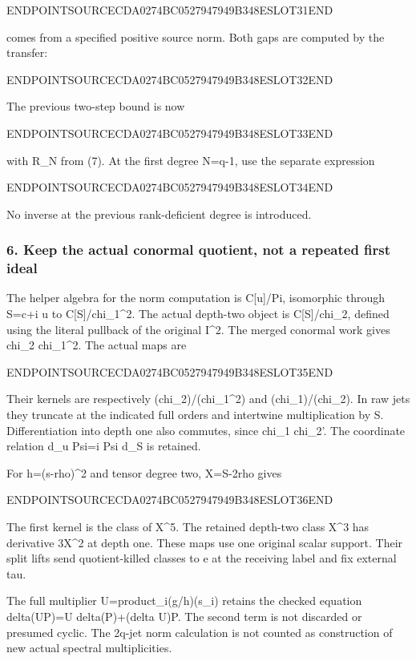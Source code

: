 ENDPOINTSOURCECDA0274BC0527947949B348ESLOT31END

comes from a specified positive source norm. Both gaps are computed by the transfer:

ENDPOINTSOURCECDA0274BC0527947949B348ESLOT32END

The previous two-step bound is now

ENDPOINTSOURCECDA0274BC0527947949B348ESLOT33END

with R\_N from (7). At the first degree N=q-1, use the separate expression

ENDPOINTSOURCECDA0274BC0527947949B348ESLOT34END

No inverse at the previous rank-deficient degree is introduced.

\subsubsection{6. Keep the actual conormal quotient, not a repeated first ideal}\label{endpoint-pr24_original--keep-the-actual-conormal-quotient-not-a-repeated-first-ideal}

The helper algebra for the norm computation is C{[}u{]}/Pi, isomorphic through S=c+i u to C{[}S{]}/chi\_1\^{}2. The actual depth-two object is C{[}S{]}/chi\_2, defined using the literal pullback of the original I\^{}2. The merged conormal work gives chi\_2 \textbar{} chi\_1\^{}2. The actual maps are

ENDPOINTSOURCECDA0274BC0527947949B348ESLOT35END

Their kernels are respectively (chi\_2)/(chi\_1\^{}2) and (chi\_1)/(chi\_2). In raw jets they truncate at the indicated full orders and intertwine multiplication by S. Differentiation into depth one also commutes, since chi\_1 \textbar{} chi\_2'. The coordinate relation d\_u Psi=i Psi d\_S is retained.

For h=(s-rho)\^{}2 and tensor degree two, X=S-2rho gives

ENDPOINTSOURCECDA0274BC0527947949B348ESLOT36END

The first kernel is the class of X\^{}5. The retained depth-two class X\^{}3 has derivative 3X\^{}2 at depth one. These maps use one original scalar support. Their split lifts send quotient-killed classes to e at the receiving label and fix external tau.

The full multiplier U=product\_i(g/h)(s\_i) retains the checked equation delta(UP)=U delta(P)+(delta U)P. The second term is not discarded or presumed cyclic. The 2q-jet norm calculation is not counted as construction of new actual spectral multiplicities.

